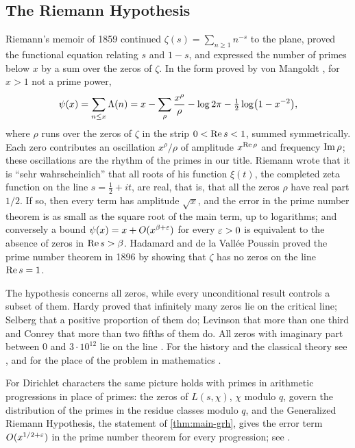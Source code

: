 \subsection{The Riemann Hypothesis}\label{ss:intro-history}
Riemann's memoir of 1859 \cite{Riemann1859} continued $\zeta(s)=\sum_{n\ge1}n^{-s}$ to the plane,
proved the functional equation relating $s$ and $1-s$, and expressed the number of primes below $x$
by a sum over the zeros of $\zeta$. In the form proved by von Mangoldt \cite{vonMangoldt1895}, for
$x>1$ not a prime power,
\begin{equation}\label{eq:explicit-formula}
  \psi(x)=\sum_{n\le x}\Lambda(n)=x-\sum_{\rho}\frac{x^\rho}{\rho}-\log2\pi-\tfrac12\log\bigl(1-x^{-2}\bigr),
\end{equation}
where $\rho$ runs over the zeros of $\zeta$ in the strip $0<\operatorname{Re} s<1$, summed symmetrically. Each zero
contributes an oscillation $x^\rho/\rho$ of amplitude $x^{\operatorname{Re}\rho}$ and frequency $\operatorname{Im}\rho$; these
oscillations are the rhythm of the primes in our title. Riemann wrote that it is ``sehr
wahrscheinlich'' that all roots of his function $\xi(t)$, the completed zeta function on the line
$s=\frac12+it$, are real, that is, that all the zeros $\rho$ have real part $1/2$. If so, then every term has amplitude $\sqrt x$, and the error in
the prime number theorem is as small as the square root of the main term, up to logarithms; and
conversely a bound $\psi(x)=x+O(x^{\beta+\varepsilon})$ for every $\varepsilon>0$ is equivalent to the absence of
zeros in $\operatorname{Re} s>\beta$. Hadamard \cite{Hadamard1896} and de la Vall\'ee Poussin
\cite{ValleePoussin1896} proved the prime number theorem in 1896 by showing that $\zeta$ has no
zeros on the line $\operatorname{Re} s=1$.

The hypothesis concerns all zeros, while every unconditional result controls a subset of them. Hardy
\cite{Hardy1914} proved that infinitely many zeros lie on the critical line; Selberg
\cite{Selberg1942} that a positive proportion of them do; Levinson \cite{Levinson1974} that more than
one third and Conrey \cite{Conrey1989} that more than two fifths of them do. All zeros with imaginary
part between $0$ and $3\cdot10^{12}$ lie on the line \cite{PlattTrudgian2021}. For the history and the
classical theory see \cite{Edwards1974,Titchmarsh1986}, and for the place of the problem in
mathematics \cite{Bombieri2000,Conrey2003}.

For Dirichlet characters the same picture holds with primes in arithmetic progressions in place of
primes: the zeros of $L(s,\chi)$, $\chi$ modulo $q$, govern the distribution of the primes in the
residue classes modulo $q$, and the Generalized Riemann Hypothesis, the statement of
\cref{thm:main-grh}, gives the error term $O(x^{1/2+\varepsilon})$ in the prime number theorem for every
progression; see \cite{Davenport1980,MontgomeryVaughan2007,IwaniecKowalski2004}.

